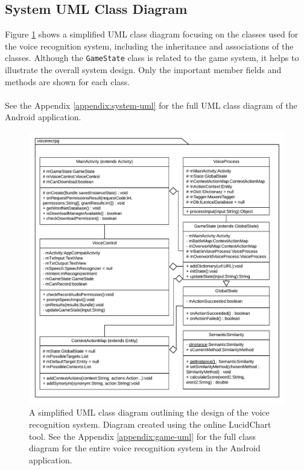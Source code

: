 \documentclass[12pt]{article}
\begin{document}
\subsection{System UML Class Diagram}

Figure \ref{fig:system-overview} shows a simplified UML class diagram focusing on the classes used for the voice recognition system, including the inheritance and associations of the classes. Although the \texttt{GameState} class is related to the game system, it helps to illustrate the overall system design. Only the important member fields and methods are shown for each class.
\\
\\
See the Appendix \ref{appendix:system-uml} for the full UML class diagram of the Android application.

\begin{center}
\begin{figure}[H]
\begin{center}
  \includegraphics[width=\linewidth]{system-overview.pdf}
  \caption{A simplified UML class diagram outlining the design of the voice recognition system. Diagram created using the online LucidChart tool. See the Appendix \ref{appendix:game-uml} for the full class diagram for the entire voice recognition system in the Android application.}
  \label{fig:system-overview}
  \end{center}
\end{figure}
\end{center}
\end{document}
